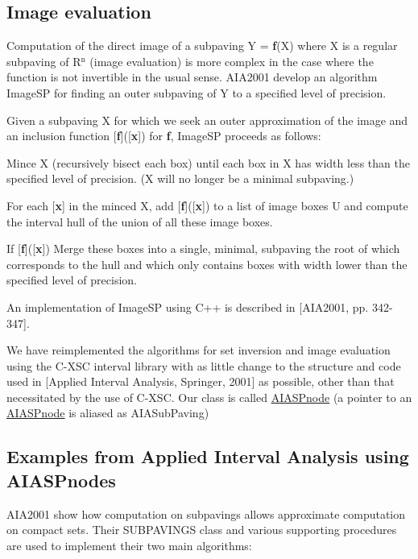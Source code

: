 \hypertarget{AIASubPavings_AIAsec_imageSp}{}\subsection{\-Image evaluation}\label{AIASubPavings_AIAsec_imageSp}
\-Computation of the direct image of a subpaving \-Y = {\bfseries f}(\-X) where \-X is a regular subpaving of \-R$^{\mbox{n}}$  (image evaluation) is more complex in the case where the function is not invertible in the usual sense. \-A\-I\-A2001 develop an algorithm \-Image\-S\-P for finding an outer subpaving of \-Y to a specified level of precision.

\-Given a subpaving \-X for which we seek an outer approximation of the image and an inclusion function \mbox{[}{\bfseries f}\mbox{]}(\mbox{[}{\bfseries x}\mbox{]}) for {\bfseries f}, \-Image\-S\-P proceeds as follows\-:


\begin{DoxyEnumerate}
\item \-Mince \-X (recursively bisect each box) until each box in \-X has width less than the specified level of precision. (\-X will no longer be a minimal subpaving.) 
\item \-For each \mbox{[}{\bfseries x}\mbox{]} in the minced \-X, add \mbox{[}{\bfseries f}\mbox{]}(\mbox{[}{\bfseries x}\mbox{]}) to a list of image boxes \-U and compute the interval hull of the union of all these image boxes. 
\item \-If \mbox{[}{\bfseries f}\mbox{]}(\mbox{[}{\bfseries x}\mbox{]}) \-Merge these boxes into a single, minimal, subpaving the root of which corresponds to the hull and which only contains boxes with width lower than the specified level of precision. 
\end{DoxyEnumerate}

\-An implementation of \-Image\-S\-P using \-C++ is described in \mbox{[}\-A\-I\-A2001, pp. 342-\/347\mbox{]}.

\-We have reimplemented the algorithms for set inversion and image evaluation using the \-C-\/\-X\-S\-C interval library with as little change to the structure and code used in \mbox{[}\-Applied \-Interval \-Analysis, \-Springer, 2001\mbox{]} as possible, other than that necessitated by the use of \-C-\/\-X\-S\-C. \-Our class is called \hyperlink{classAIASPnode}{\-A\-I\-A\-S\-Pnode} (a pointer to an \hyperlink{classAIASPnode}{\-A\-I\-A\-S\-Pnode} is aliased as \-A\-I\-A\-Sub\-Paving)



\hypertarget{AIASubPavings_AIAsec_examples}{}\subsection{\-Examples from Applied Interval Analysis using A\-I\-A\-S\-Pnodes}\label{AIASubPavings_AIAsec_examples}
\-A\-I\-A2001 show how computation on subpavings allows approximate computation on compact sets. \-Their \-S\-U\-B\-P\-A\-V\-I\-N\-G\-S class and various supporting procedures are used to implement their two main algorithms\-:


